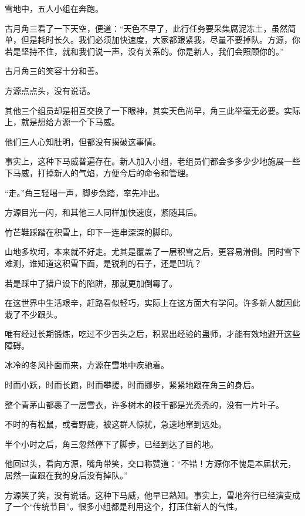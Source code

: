 
\begin{this_body}



雪地中，五人小组在奔跑。

古月角三看了一下天空，便道：“天色不早了，此行任务要采集腐泥冻土，虽然简单，但是耗时长久。我们必须加快速度，大家都跟紧我，尽量不要掉队。方源，你若是坚持不住，就和我们说一声，没有关系的。你是新人，我们会照顾你的。”

古月角三的笑容十分和善。

方源点点头，没有说话。

其他三个组员却是相互交换了一下眼神，其实天色尚早，角三此举毫无必要。实际上，就是想给方源一个下马威。

他们三人心知肚明，但都没有揭破这事情。

事实上，这种下马威普遍存在。新人加入小组，老组员们都会多多少少地施展一些下马威，打掉新人的气焰，方便今后的命令和管理。

“走。”角三轻喝一声，脚步急踏，率先冲出。

方源目光一闪，和其他三人同样加快速度，紧随其后。

竹芒鞋踩踏在积雪上，印下一连串深深的脚印。

山地多坎坷，本来就不好走。尤其是覆盖了一层积雪之后，更容易滑倒。同时雪下难测，谁知道这积雪下面，是锐利的石子，还是凹坑？

若是踩中了猎户设下的陷阱，那就更加倒霉了。

在这世界中生活艰辛，赶路看似轻巧，实际上在这方面大有学问。许多新人就因此栽了不少跟头。

唯有经过长期锻炼，吃过不少苦头之后，积累出经验的蛊师，才能有效地避开这些障碍。

冰冷的冬风扑面而来，方源在雪地中疾驰着。

时而小跃，时而长跑，时而攀援，时而挪步，紧紧地跟在角三的身后。

整个青茅山都裹了一层雪衣，许多树木的枝干都是光秃秃的，没有一片叶子。

不时的有松鼠，或者野鹿，被这群人惊扰，急速地窜到远处。

半个小时之后，角三忽然停下了脚步，已经到达了目的地。

他回过头，看向方源，嘴角带笑，交口称赞道：“不错！方源你不愧是本届状元，居然一直跟在我的身后没有掉队。”

方源笑了笑，没有说话。这种下马威，他早已熟知。事实上，雪地奔行已经演变成了一个“传统节目”。很多小组都是利用这个，打压住新人的气性。


\end{this_body}
